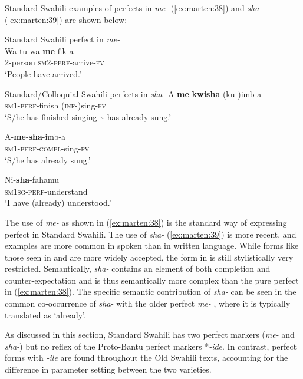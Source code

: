 \documentclass[output=paper]{langscibook}
\begin{document}
Standard Swahili examples of perfects in \textit{me-} (\ref{ex:marten:38}) and \textit{sha-} (\ref{ex:marten:39}) are shown below:

\ea\label{ex:marten:38}Standard Swahili perfect in \textit{me-}\\
\gll Wa-tu     wa-\textbf{me}{}-fik-a \\
2-person    \textsc{sm2-perf}{}-arrive-\textsc{fv}\\
\glt ‘People have arrived.’ 
\z

\ea\label{ex:marten:39}Standard/Colloquial Swahili perfects in \textit{sha-}
    \ea\label{ex:marten:39a} \gll  A-\textbf{me}{}-\textbf{kwisha}     (ku-)imb-a \\
    \textsc{sm1-perf}{}-finish   (\textsc{inf}{}-)sing-\textsc{fv}\\
    \glt ‘S/he has finished singing {\textasciitilde} has already sung.’

    \ex\label{ex:marten:39b} \gll  A-\textbf{me}{}-\textbf{sha}{}-imb-a \\
    \textsc{sm1-perf-compl}{}-sing-\textsc{fv} \\
    \glt ‘S/he has already sung.’

    \ex\label{ex:marten:39c} \gll  Ni-\textbf{sha}{}-fahamu \\
    \textsc{sm1sg-perf}{}-understand\\
    \glt ‘I have (already) understood.’
    \z
\z

The use of \textit{{}me-} as shown in (\ref{ex:marten:38}) is the standard way of expressing perfect in Standard Swahili. The use of \textit{{}sha-}  (\ref{ex:marten:39}) is more recent, and examples are more common in spoken than in written language. While forms like those seen in  and  are more widely accepted, the form in  is still stylistically very restricted. Semantically, \textit{{}sha-} contains an element of both completion and counter-expectation and is thus semantically more complex than the pure perfect in (\ref{ex:marten:38}). The specific semantic contribution of \textit{{}sha-} can be seen in the common co-occurrence of \textit{{}sha-} with the older perfect \textit{{}me-} , where it is typically translated as ‘already’. 

  As discussed in this section, Standard Swahili has two perfect markers (\textit{{}me-} and \textit{{}sha-}) but no reflex of the Proto-Bantu perfect markers *\textit{{}-ide}. In contrast, perfect forms with \textit{{}-ile} are found throughout the Old Swahili texts, accounting for the difference in parameter setting between the two varieties. 
\end{document}
